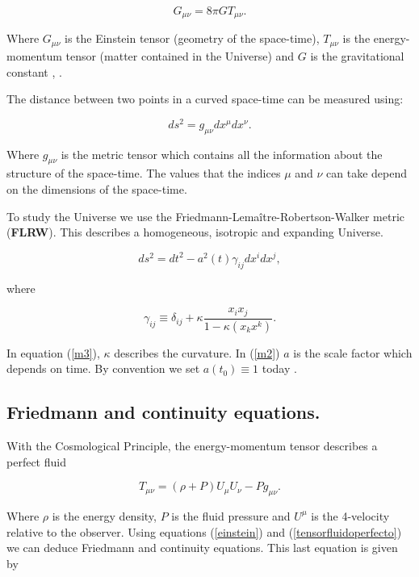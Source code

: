 \documentclass[onecolumn,           %
               showpacs,            %
               preprintnumbers,     %
               aps,                 %
               prl,          	    %
               letterpaper,             %
               superscriptaddress,      %
               nofootinbib,         %
               tightenlines,        %
               floats,floatfix      %
               ,usenatbib,
               ]{revtex4-1}
\begin{document}
\begin{equation}
\label{einstein}
G_{\mu \nu} = 8\pi G T_{\mu \nu}.
\end{equation}

Where $G_{\mu \nu}$ is the Einstein tensor (geometry of the space-time), $T_{\mu \nu}$ is the energy-momentum tensor (matter contained in the Universe) and $G$ is the gravitational constant \cite{baumann}, \cite{wald}.

The distance between two points in a curved space-time can be measured using:

\begin{equation}
ds^2 = g_{\mu \nu}dx^{\mu}dx^{\nu}.
\end{equation}

Where $g_{\mu \nu}$ is the metric tensor which contains all the information about the structure of the space-time. The values that the indices $\mu$ and $\nu$ can take depend on the dimensions of the space-time.

To study the Universe we use the Friedmann-Lema\^itre-Robertson-Walker metric (\textbf{FLRW}). This describes a homogeneous, isotropic and expanding Universe.

\begin{equation}
\label{m2}
ds^2 = dt^2 -a^2(t)\gamma_{ij}dx^idx^j ,
\end{equation}

where

\begin{equation}
\label{m3}
\gamma_{ij} \equiv \delta_{ij} + \kappa \frac{x_i x_j}{1 - \kappa \left(x_k x^k\right)}.
\end{equation}

In equation (\ref{m3}), $\kappa$ describes the curvature. In (\ref{m2}) $a$ is the scale factor which depends on time. By convention we set $a(t_0) \equiv 1$ today \cite{cambridge}.

\subsection{Friedmann and continuity equations.}
With the Cosmological Principle, the energy-momentum tensor describes a perfect fluid \cite{cambridge}

\begin{equation}
\label{tensorfluidoperfecto}
T_{\mu \nu} = (\rho + P)U_{\mu}U_{\nu} - Pg_{\mu \nu} .
\end{equation} 

Where $\rho$ is the energy density, $P$ is the fluid pressure and $U^{\mu}$ is the 4-velocity relative to the observer. Using equations (\ref{einstein}) and (\ref{tensorfluidoperfecto}) we can deduce Friedmann and continuity equations. This last equation is given by
\end{document}
